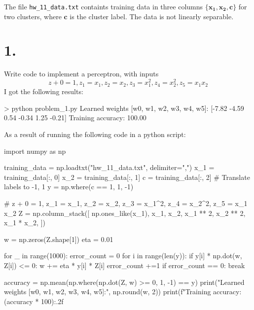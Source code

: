 \documentclass{article}
\begin{document}
\thispagestyle{firstpageheader}
{\Large

The file \verb|hw_11_data.txt| containts training data in three columns \(\{\mathbf{x_1}, \mathbf{x_2}, \mathbf{c}\}\) for two clusters, where \(\mathbf{c}\) is the cluster label. The data is not linearly separable.

}
{\Large 

\section*{1.}

Write code to implement a perceptron, with inputs 
\[
  z+0 = 1, z_1 = x_1, z_2 = x_2, z_3 = x^2_1, z_4 = x^2_2, z_5 = x_1 x_2
\]
I got the following results:
\begin{spverbatim}
> python problem_1.py
Learned weights [w0, w1, w2, w3, w4, w5]: [-7.82 -4.59  0.54 -0.34  1.25 -0.21]
Training accuracy: 100.00%
\end{spverbatim}
As a result of running the following code in a python script:
\begin{spverbatim}
import numpy as np 

training_data = np.loadtxt("hw_11_data.txt", delimiter=",")
x_1 = training_data[:, 0]
x_2 = training_data[:, 1]
c = training_data[:, 2]
# Translate labels to {-1, 1}
y = np.where(c == 1, 1, -1)

# z + 0 = 1, z_1 = x_1, z_2 = x_2, z_3 = x_1^2, z_4 = x_2^2, z_5 = x_1 x_2
Z = np.column_stack([
  np.ones_like(x_1),
  x_1,
  x_2,
  x_1 ** 2,
  x_2 ** 2,
  x_1 * x_2,
])

w = np.zeros(Z.shape[1])
eta = 0.01

for _ in range(1000):
  error_count = 0
  for i in range(len(y)):
    if y[i] * np.dot(w, Z[i]) <= 0:
      w += eta * y[i] * Z[i]
      error_count +=1
  if error_count == 0:
    break

accuracy = np.mean(np.where(np.dot(Z, w) >= 0, 1, -1) == y)
print("Learned weights [w0, w1, w2, w3, w4, w5]:", np.round(w, 2))
print(f"Training accuracy: {(accuracy * 100):.2f}%
\end{spverbatim}

}
\end{document}
